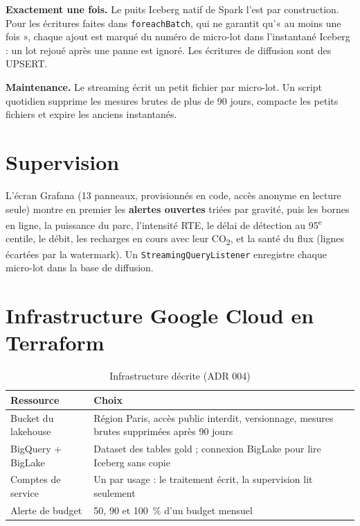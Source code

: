 \documentclass[11pt, a4paper, oneside, headings=normal, numbers=noenddot, DIV=12]{scrartcl}
\begin{document}
\textbf{Exactement une fois.} Le puits Iceberg natif de Spark l'est par construction. Pour les écritures faites dans \texttt{foreachBatch},
qui ne garantit qu'« au moins une fois », chaque ajout est marqué du numéro de micro-lot dans l'instantané Iceberg : un lot rejoué après une panne
est ignoré. Les écritures de diffusion sont des UPSERT.

\textbf{Maintenance.} Le streaming écrit un petit fichier par micro-lot. Un script quotidien supprime les mesures brutes de plus de 90 jours,
compacte les petits fichiers et expire les anciens instantanés.

\section{Supervision}

L'écran Grafana (13 panneaux, provisionnés en code, accès anonyme en lecture seule) montre en premier les \textbf{alertes ouvertes} triées par
gravité, puis les bornes en ligne, la puissance du parc, l'intensité RTE, le délai de détection au 95\textsuperscript{e} centile, le débit, les
recharges en cours avec leur CO\textsubscript{2}, et la santé du flux (lignes écartées par la watermark). Un \texttt{StreamingQueryListener}
enregistre chaque micro-lot dans la base de diffusion.

\section{Infrastructure Google Cloud en Terraform}

\begin{table}[H]
\centering\small
\begin{tabularx}{\linewidth}{@{}L{4.2cm} Y@{}}
\toprule
\textbf{Ressource} & \textbf{Choix} \\
\midrule
Bucket du lakehouse & Région Paris, accès public interdit, versionnage, mesures brutes supprimées après 90 jours \\
BigQuery + BigLake & Dataset des tables gold ; connexion BigLake pour lire Iceberg sans copie \\
Comptes de service & Un par usage : le traitement écrit, la supervision lit seulement \\
Alerte de budget & 50, 90 et 100~\% d'un budget mensuel \\
\bottomrule
\end{tabularx}
\caption{Infrastructure décrite (ADR 004)}
\end{table}
\end{document}

